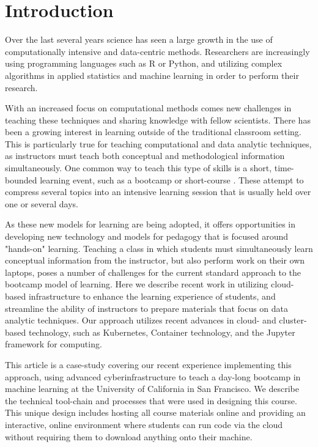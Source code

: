 \section{Introduction}

Over the last several years science has seen a large growth in the use of
computationally intensive and data-centric methods. Researchers are
increasingly using programming languages such as R or Python, and utilizing
complex algorithms in applied statistics and machine learning in order to
perform their research.

With an increased focus on computational methods
comes new challenges in teaching these techniques and sharing
knowledge with fellow scientists. There has been a growing interest in learning
outside of the traditional classroom setting. This is particularly true
for teaching computational and data analytic techniques,
as instructors must teach both conceptual and methodological information
simultaneously. One common way to teach this type of skills is a short,
time-bounded learning event, such as a bootcamp or short-course
\cite{wilson2016software}. These attempt to compress several
topics into an intensive learning session that is usually held over one or
several days.

As these new models for learning are being adopted, it offers
opportunities in developing new technology and models for pedagogy that is
focused around "hands-on" learning. Teaching a class in which students
must simultaneously learn conceptual information from the instructor, but also
perform work on their own laptops, poses a number of challenges for the
current standard approach to the bootcamp model of learning. Here we describe
recent work in utilizing cloud-based infrastructure to enhance the learning
experience of students, and streamline the ability of instructors to
prepare materials that focus on data analytic techniques. Our approach
utilizes recent advances in cloud- and cluster- based technology, such
as Kubernetes, Container technology, and the Jupyter framework for computing.

This article is a case-study covering our recent experience implementing this approach, using
advanced cyberinfrastructure to teach a day-long bootcamp in machine learning at
the University of California in San Francisco. We describe the
technical tool-chain and processes that were used in designing this course. This
unique design includes hosting all course materials online and providing
an interactive, online environment where students can run code via the cloud
without requiring them to download anything onto their machine.

